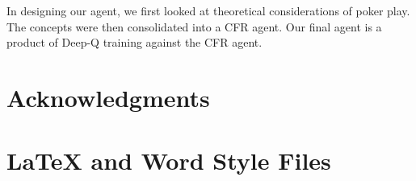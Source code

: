 \documentclass{article}
\begin{document}
In designing our agent, we first looked at theoretical considerations of poker play. The concepts were then consolidated into a CFR agent. Our final agent is a product of Deep-Q training against the CFR agent.

\section{Acknowledgments}

\appendix

\section{\LaTeX{} and Word Style Files}\label{stylefiles}



\end{document}
